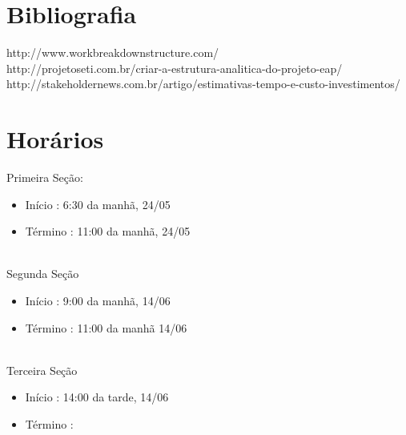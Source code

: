 \documentclass[12pt,a4paper,final]{report}
\begin{document}
\newpage
\section*{Bibliografia}
http://www.workbreakdownstructure.com/\\
http://projetoseti.com.br/criar-a-estrutura-analitica-do-projeto-eap/\\
http://stakeholdernews.com.br/artigo/estimativas-tempo-e-custo-investimentos/

\section*{Horários}
Primeira Seção:\\
\begin{itemize}
\item Início : 6:30 da manhã, 24/05
\item Término : 11:00 da manhã, 24/05
\end{itemize}
\\
Segunda Seção\\
\begin{itemize}
\item Início : 9:00 da manhã, 14/06
\item Término : 11:00 da manhã 14/06
\end{itemize}
\\
Terceira Seção\\
\begin{itemize}
\item Início : 14:00 da tarde, 14/06
\item Término : 
\end{itemize}
\end{document}
